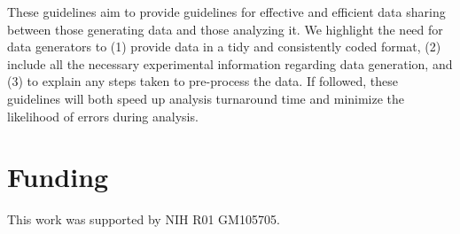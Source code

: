 \documentclass[12pt]{article}
\begin{document}
These guidelines aim to provide guidelines for effective and efficient
data sharing between those generating data and those analyzing it. We
highlight the need for data generators to (1) provide data in a tidy and
consistently coded format, (2) include all the necessary experimental
information regarding data generation, and (3) to explain any steps
taken to pre-process the data. If followed, these guidelines will both
speed up analysis turnaround time and minimize the likelihood of errors
during analysis.

\section{Funding}\label{funding}

This work was supported by NIH R01 GM105705.



\end{document}

